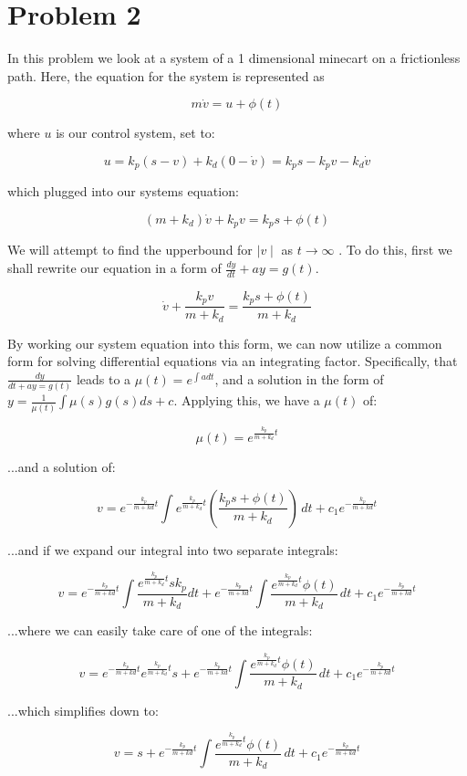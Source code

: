\documentclass{article}
\begin{document}
\section*{Problem 2}

In this problem we look at a system of a 1 dimensional minecart on a frictionless path. Here, the equation for the system is represented as

\[m\dot v = u +\phi(t)\]

where \(u\) is our control system, set to:

\[u=k_p(s-v)+k_d(0-\dot v)=k_ps-k_pv-k_d\dot v\]

which plugged into our systems equation:

\[(m+k_d)\dot v + k_p v = k_p s + \phi(t)\]

We will attempt to find the upperbound for \(\mid v \mid\) as \(t \to \infty\) . To do this, first we shall rewrite our equation in a form of \(\frac{dy}{dt}+ay=g(t)\).

\[\dot v + \frac{k_p v}{m+k_d}= \frac{k_p s + \phi(t)}{m+k_d}\]

By working our system equation into this form, we can now utilize a common form for solving differential equations via an integrating factor. Specifically, that $\frac{dy}{dt+ay=g(t)}$ leads to a $\mu (t)=e^{\int a dt}$, and a solution in the form of $ y = \frac{1}{\mu(t)} \int \mu(s)g(s) ds + c $. Applying this, we have a $\mu(t)$ of:

\[\mu(t) = e^{\frac{k_p}{m+k_d}t}\]

...and a solution of:

\[v = e^{-\frac{k_p}{m+kd}t} \int {e^{\frac{k_p}{m+k_d}t}(\frac{k_p s + \phi(t)}{m + k_d})} \,dt + c_1 e^{-\frac{k_p}{m+kd}t} \]

...and if we expand our integral into two separate integrals: 

\[v = e^{-\frac{k_p}{m+kd}t} \int \frac{e^{\frac{k_p}{m+k_d}t} s k_p}{m+k_d} dt + e^{-\frac{k_p}{m+kd}t} \int \frac{e^{\frac{k_p}{m+k_d}t} \phi(t)}{m + k_d} \,dt + c_1 e^{-\frac{k_p}{m+kd}t}\]

...where we can easily take care of one of the integrals:

\[v = e^{-\frac{k_p}{m+kd}t} e^{\frac{k_p}{m+k_d} t } s + e^{-\frac{k_p}{m+kd}t} \int \frac{e^{\frac{k_p}{m+k_d}t} \phi(t)}{m + k_d} \,dt + c_1 e^{-\frac{k_p}{m+kd}t}\]

...which simplifies down to:

\[v = s + e^{-\frac{k_p}{m+kd}t} \int \frac{e^{\frac{k_p}{m+k_d}t} \phi(t)}{m + k_d} \,dt + c_1 e^{-\frac{k_p}{m+kd}t}\]
\end{document}
